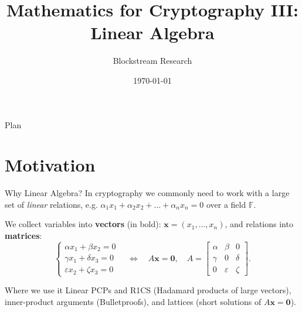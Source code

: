 \documentclass{zkdl-presentation-template}
\title[Linear Algebra]{\textbf{Mathematics for Cryptography III: Linear Algebra}}
\author{Blockstream Research}
\date{\today}
\begin{document}
    \maketitleframe

    \begin{frame}{Plan}
      \tableofcontents[hideallsubsections]
    \end{frame}


    \section{Motivation}

    \begin{frame}{Why Linear Algebra?}
        In cryptography we commonly need to work with a large set of \textit{linear} relations, e.g. $\alpha_1x_1 + \alpha_2x_2 + \dots + \alpha_nx_n = 0$ over a field $\mathbb{F}$.
        \pause

        We collect variables into \textbf{vectors} (in bold): $\mathbf{x}=(x_1,\dots,x_n)$, and relations into \textbf{matrices}:
        \begin{equation*}
            \begin{cases}
                \alpha x_1 + \beta x_2 = 0 \\
                \gamma x_1 + \delta x_3 = 0 \\
                \varepsilon x_2 + \zeta x_3 = 0
            \end{cases}
            \quad \Longleftrightarrow \quad
            A\mathbf{x} = \mathbf{0}, \quad A = \begin{bmatrix}
                \alpha & \beta & 0 \\
                \gamma & 0 & \delta \\
                0 & \varepsilon & \zeta
            \end{bmatrix}.
        \end{equation*}
        \pause

        \begin{remarkblock}{Where we use it}
            Linear PCPs and R1CS (Hadamard products of large vectors), inner-product arguments (Bulletproofs), and lattices (short solutions of $A\mathbf{x} = \mathbf{0}$).
        \end{remarkblock}
    \end{frame}
\end{document}
